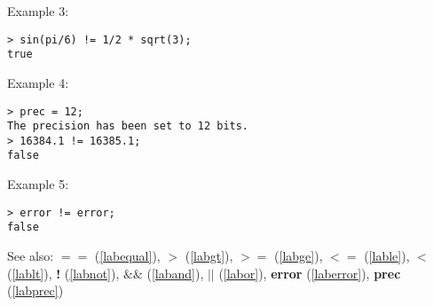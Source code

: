 \noindent Example 3: 
\begin{center}\begin{minipage}{15cm}\begin{Verbatim}[frame=single]
> sin(pi/6) != 1/2 * sqrt(3);
true
\end{Verbatim}
\end{minipage}\end{center}
\noindent Example 4: 
\begin{center}\begin{minipage}{15cm}\begin{Verbatim}[frame=single]
> prec = 12;
The precision has been set to 12 bits.
> 16384.1 != 16385.1;
false
\end{Verbatim}
\end{minipage}\end{center}
\noindent Example 5: 
\begin{center}\begin{minipage}{15cm}\begin{Verbatim}[frame=single]
> error != error;
false
\end{Verbatim}
\end{minipage}\end{center}
See also: \textbf{$==$} (\ref{labequal}), \textbf{$>$} (\ref{labgt}), \textbf{$>=$} (\ref{labge}), \textbf{$<=$} (\ref{lable}), \textbf{$<$} (\ref{lablt}), \textbf{!} (\ref{labnot}), \textbf{$\&\&$} (\ref{laband}), \textbf{$||$} (\ref{labor}), \textbf{error} (\ref{laberror}), \textbf{prec} (\ref{labprec})
